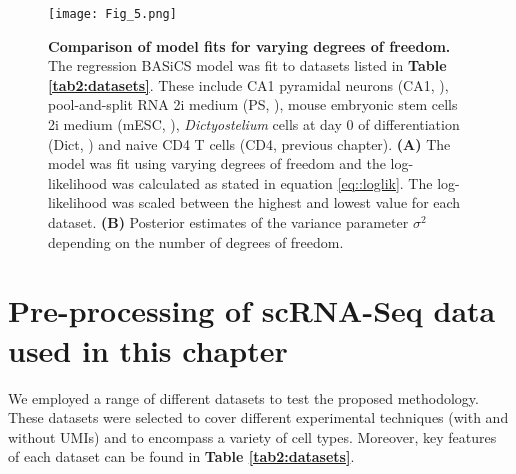 \begin{figure}[!h]
\centering
\texttt{[image: Fig\_5.png]}
\caption[Comparison of model fits for varying degrees of freedom]{\textbf{Comparison of model fits for varying degrees of freedom.}\\
The regression BASiCS model was fit to datasets listed in \textbf{Table \ref{tab2:datasets}}. These include CA1 pyramidal neurons (CA1, \citep{Zeisel2015}), pool-and-split RNA 2i medium (PS, \citep{Grun2014}), mouse embryonic stem cells 2i medium (mESC, \citep{Grun2014}), \textit{Dictyostelium} cells at day 0 of differentiation (Dict, \citep{Antolovic2017}) and naive CD4\plus{} T cells (CD4, previous chapter). \textbf{(A)} The model was fit using varying degrees of freedom and the log-likelihood was calculated as stated in equation \eqref{eq::loglik}. The log-likelihood was scaled between the highest and lowest value for each dataset. \textbf{(B)} Posterior estimates of the variance parameter $\sigma^2$ depending on the number of degrees of freedom.}
\label{fig2:DoF}
\end{figure}


\section{Pre-processing of scRNA-Seq data used in this chapter} \label{sec2:datasets}

We employed a range of different datasets to test the proposed methodology. These datasets were selected to cover different experimental techniques (with and without UMIs) and to encompass a variety of cell types. Moreover, key features of each dataset can be found in \textbf{Table \ref{tab2:datasets}}. 

